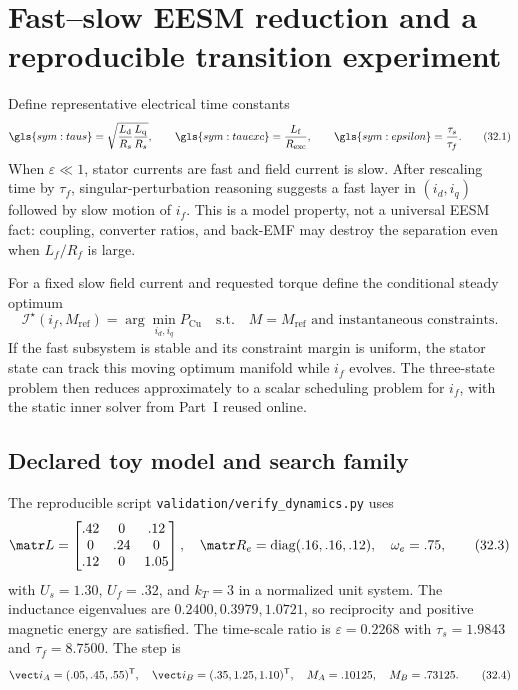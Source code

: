 \section{Fast--slow EESM reduction and a reproducible transition experiment}
\label{sec:fast-slow-experiment}

Define representative electrical time constants
\[
 \gls{sym:taus}=\sqrt{\frac{L_{\mathrm d}}{R_s}
                         \frac{L_{\mathrm q}}{R_s}},
 \qquad
 \gls{sym:tauexc}=\frac{L_{\mathrm f}}{R_{\mathrm{exc}}},
 \qquad
 \gls{sym:epsilon}=\frac{\tau_s}{\tau_f}.
 \tag{32.1}
\]
When \(\varepsilon\ll1\), stator currents are fast and field current is slow.
After rescaling time by \(\tau_f\), singular-perturbation reasoning suggests a
fast layer in \((i_d,i_q)\) followed by slow motion of \(i_f\).  This is a
model property, not a universal EESM fact: coupling, converter ratios, and
back-EMF may destroy the separation even when \(L_f/R_f\) is large.

For a fixed slow field current and requested torque define the conditional
steady optimum
\[
 \mathcal I^\star(i_f,M_{\mathrm{ref}})=
 \arg\min_{i_d,i_q}P_{\mathrm{Cu}}
 \quad\text{s.t.}\quad M=M_{\mathrm{ref}}
 \text{ and instantaneous constraints}.
 \tag{32.2}
\]
If the fast subsystem is stable and its constraint margin is uniform, the
stator state can track this moving optimum manifold while \(i_f\) evolves.
The three-state problem then reduces approximately to a scalar scheduling
problem for \(i_f\), with the static inner solver from Part~I reused online.



\subsection{Declared toy model and search family}

The reproducible script \texttt{validation/verify\_dynamics.py} uses
\[
 \matr L=\begin{bmatrix}.42&0&.12\\0&.24&0\\.12&0&1.05\end{bmatrix},
 \quad
 \matr R_e=\operatorname{diag}(.16,.16,.12),
 \quad \omega_e=.75,
 \tag{32.3}
\]
with \(U_s=1.30\), \(U_f=.32\), and \(k_T=3\) in a normalized unit system.
The inductance eigenvalues are \(0.2400,0.3979,1.0721\), so reciprocity and
positive magnetic energy are satisfied.  The time-scale ratio is
\(\varepsilon=0.2268\) with \(\tau_s=1.9843\) and \(\tau_f=8.7500\).
The step is
\[
 \vect i_A=(.05,.45,.55)^{\mathsf T},\quad
 \vect i_B=(.35,1.25,1.10)^{\mathsf T},\quad
 M_A=.10125,\quad M_B=.73125.
 \tag{32.4}
\]


